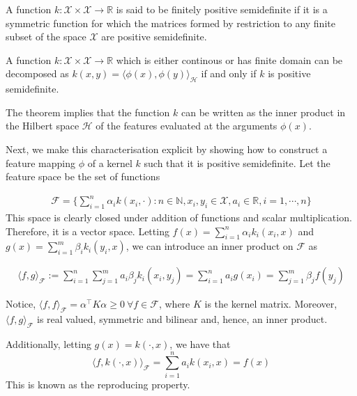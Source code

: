 \begin{definition}
    A function $k: \mathcal{X} \times \mathcal{X} \to \mathbb{R}$ is said to be finitely positive semidefinite if it is a symmetric function for which the matrices formed by restriction to any finite subset of the space $\mathcal{X}$ are positive semidefinite.
\end{definition}

\begin{theorem}    
    A function $k:\mathcal{X} \times \mathcal{X} \to \mathbb{R}$ which is either continous or has finite domain can be decomposed as $k(x,y)=\langle \phi(x), \phi(y) \rangle_{\mathcal{H}}$ if and only if $k$ is positive semidefinite.
\end{theorem}

The theorem implies that the function $k$ can be written as the inner product in the Hilbert space $\mathcal{H}$ of the features evaluated at the arguments $\phi(x)$.

Next, we make this characterisation explicit by showing how to construct a feature mapping $\phi$ of a kernel $k$ such that it is positive semidefinite.
Let the feature space be the set of functions 

$$ 
\begin{aligned}
    \mathcal{F} =\bigg\{ \sum\limits_{i=1}^n \alpha_i k(x_i, \cdot): n \in \mathbb{N}, x_i, y_i \in \mathcal{X}, a_i \in \mathbb{R}, i=1,\cdots, n \bigg\}    
\end{aligned}
$$
This space is clearly closed under addition of functions and scalar multiplication. Therefore, it is a vector space.
Letting $f(x)=\sum\limits_{i=1}^n \alpha_i k_i(x_i,x)$ and $g(x)=\sum\limits_{i=1}^m \beta_i k_i(y_i,x)$,  we can introduce an inner product on $\mathcal{F}$ as 

$$
\begin{aligned}
    \langle f,g \rangle_{\mathcal{F}}:=\sum\limits_{i=1}^n\sum\limits_{j=1}^m a_i \beta_j k_i(x_i,y_j)=\sum\limits_{i=1}^n a_i g(x_i)= \sum\limits_{j=1}^m \beta_j f(y_j)
\end{aligned}
$$

Notice, $\langle f, f \rangle_{\mathcal{F}}= \alpha^\intercal K \alpha \geq 0 \ \forall f \in \mathcal{F}$, where $K$ is the kernel matrix.
Moreover, $\langle f, g \rangle_{\mathcal{F}}$ is real valued, symmetric and bilinear and, hence, an inner product.

Additionally, letting $g(x)=k(\cdot, x)$, we have that 
\begin{equation}
    \langle f, k(\cdot, x)\rangle_{\mathcal{F}}=\sum\limits_{i=1}^n a_i k(x_i,x)=f(x)    
\end{equation}
This is known as the reproducing property.

